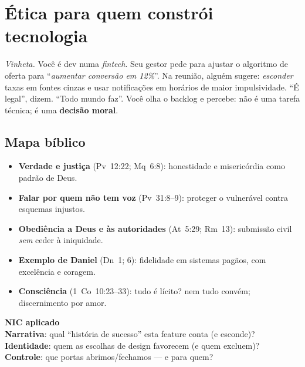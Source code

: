 \chapter{Ética para quem constrói tecnologia}
\noindent\textit{Vinheta.} Você é dev numa \emph{fintech}. Seu gestor pede para ajustar o algoritmo de oferta para ``\emph{aumentar conversão em 12\%}''. Na reunião, alguém sugere: \emph{esconder} taxas em fontes cinzas e usar notificações em horários de maior impulsividade. ``É legal'', dizem. ``Todo mundo faz''. Você olha o backlog e percebe: não é uma tarefa técnica; é uma \textbf{decisão moral}.

\section{Mapa bíblico}
\begin{itemize}[leftmargin=*,noitemsep]
  \item \textbf{Verdade e justiça} (Pv~12:22; Mq~6:8): honestidade e misericórdia como padrão de Deus.
  \item \textbf{Falar por quem não tem voz} (Pv~31:8--9): proteger o vulnerável contra esquemas injustos.
  \item \textbf{Obediência a Deus e às autoridades} (At~5:29; Rm~13): submissão civil \emph{sem} ceder à iniquidade.
  \item \textbf{Exemplo de Daniel} (Dn~1; 6): fidelidade em sistemas pagãos, com excelência e coragem.
  \item \textbf{Consciência} (1~Co~10:23--33): tudo é lícito? nem tudo convém; discernimento por amor.
\end{itemize}

\begin{nicbox}
\textbf{NIC aplicado}\\
\textbf{Narrativa}: qual ``história de sucesso'' esta feature conta (e esconde)?\\
\textbf{Identidade}: quem as escolhas de design favorecem (e quem excluem)?\\
\textbf{Controle}: que portas abrimos/fechamos --- e para quem?
\end{nicbox}

